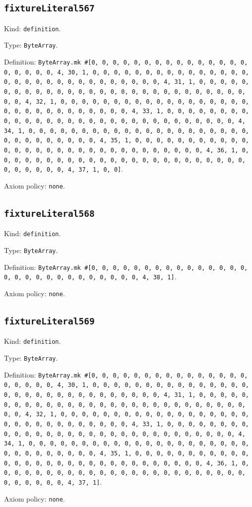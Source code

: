 \documentclass[11pt]{article}
\begin{document}
\subsection*{\texttt{fixtureLiteral567}}
\noindent Kind: \texttt{definition}.\par
\noindent Type: \texttt{ByteArray}.\par
\noindent Definition: \texttt{ByteArray.mk \#[0, 0, 0, 0, 0, 0, 0, 0, 0, 0, 0, 0, 0, 0, 0, 0, 0, 0, 0, 0, 4, 30, 1, 0, 0, 0, 0, 0, 0, 0, 0, 0, 0, 0, 0, 0, 0, 0, 0, 0, 0, 0, 0, 0, 0, 0, 0, 0, 0, 0, 0, 0, 0, 4, 31, 1, 0, 0, 0, 0, 0, 0, 0, 0, 0, 0, 0, 0, 0, 0, 0, 0, 0, 0, 0, 0, 0, 0, 0, 0, 0, 0, 0, 0, 0, 0, 4, 32, 1, 0, 0, 0, 0, 0, 0, 0, 0, 0, 0, 0, 0, 0, 0, 0, 0, 0, 0, 0, 0, 0, 0, 0, 0, 0, 0, 0, 0, 0, 0, 4, 33, 1, 0, 0, 0, 0, 0, 0, 0, 0, 0, 0, 0, 0, 0, 0, 0, 0, 0, 0, 0, 0, 0, 0, 0, 0, 0, 0, 0, 0, 0, 0, 4, 34, 1, 0, 0, 0, 0, 0, 0, 0, 0, 0, 0, 0, 0, 0, 0, 0, 0, 0, 0, 0, 0, 0, 0, 0, 0, 0, 0, 0, 0, 0, 0, 4, 35, 1, 0, 0, 0, 0, 0, 0, 0, 0, 0, 0, 0, 0, 0, 0, 0, 0, 0, 0, 0, 0, 0, 0, 0, 0, 0, 0, 0, 0, 0, 0, 4, 36, 1, 0, 0, 0, 0, 0, 0, 0, 0, 0, 0, 0, 0, 0, 0, 0, 0, 0, 0, 0, 0, 0, 0, 0, 0, 0, 0, 0, 0, 0, 0, 4, 37, 1, 0, 0]}.\par
\noindent Axiom policy: \texttt{none}.\par
\subsection*{\texttt{fixtureLiteral568}}
\noindent Kind: \texttt{definition}.\par
\noindent Type: \texttt{ByteArray}.\par
\noindent Definition: \texttt{ByteArray.mk \#[0, 0, 0, 0, 0, 0, 0, 0, 0, 0, 0, 0, 0, 0, 0, 0, 0, 0, 0, 0, 0, 0, 0, 0, 0, 0, 0, 0, 4, 38, 1]}.\par
\noindent Axiom policy: \texttt{none}.\par
\subsection*{\texttt{fixtureLiteral569}}
\noindent Kind: \texttt{definition}.\par
\noindent Type: \texttt{ByteArray}.\par
\noindent Definition: \texttt{ByteArray.mk \#[0, 0, 0, 0, 0, 0, 0, 0, 0, 0, 0, 0, 0, 0, 0, 0, 0, 0, 0, 0, 4, 30, 1, 0, 0, 0, 0, 0, 0, 0, 0, 0, 0, 0, 0, 0, 0, 0, 0, 0, 0, 0, 0, 0, 0, 0, 0, 0, 0, 0, 0, 0, 0, 4, 31, 1, 0, 0, 0, 0, 0, 0, 0, 0, 0, 0, 0, 0, 0, 0, 0, 0, 0, 0, 0, 0, 0, 0, 0, 0, 0, 0, 0, 0, 0, 0, 4, 32, 1, 0, 0, 0, 0, 0, 0, 0, 0, 0, 0, 0, 0, 0, 0, 0, 0, 0, 0, 0, 0, 0, 0, 0, 0, 0, 0, 0, 0, 0, 0, 4, 33, 1, 0, 0, 0, 0, 0, 0, 0, 0, 0, 0, 0, 0, 0, 0, 0, 0, 0, 0, 0, 0, 0, 0, 0, 0, 0, 0, 0, 0, 0, 0, 4, 34, 1, 0, 0, 0, 0, 0, 0, 0, 0, 0, 0, 0, 0, 0, 0, 0, 0, 0, 0, 0, 0, 0, 0, 0, 0, 0, 0, 0, 0, 0, 0, 4, 35, 1, 0, 0, 0, 0, 0, 0, 0, 0, 0, 0, 0, 0, 0, 0, 0, 0, 0, 0, 0, 0, 0, 0, 0, 0, 0, 0, 0, 0, 0, 0, 4, 36, 1, 0, 0, 0, 0, 0, 0, 0, 0, 0, 0, 0, 0, 0, 0, 0, 0, 0, 0, 0, 0, 0, 0, 0, 0, 0, 0, 0, 0, 0, 0, 4, 37, 1]}.\par
\noindent Axiom policy: \texttt{none}.\par
\end{document}
